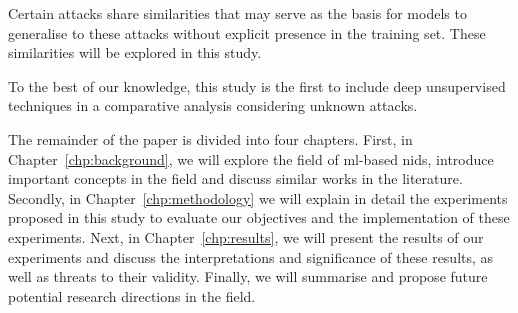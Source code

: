 \begin{center}
\end{center}

Certain attacks share similarities that may serve as the basis for models to
generalise to these attacks without explicit presence in the training set.
These similarities will be explored in this study.

To the best of our knowledge, this study is the first to include deep
unsupervised techniques in a comparative analysis considering unknown attacks.

The remainder of the paper is divided into four chapters. First, in
Chapter~\ref{chp:background}, we will explore the field of \gls{ml}-based
\gls{nids}, introduce important concepts in the field and discuss similar works
in the literature. Secondly, in Chapter~\ref{chp:methodology} we will explain in
detail the experiments proposed in this study to evaluate our objectives and
the implementation of these experiments. Next, in Chapter~\ref{chp:results}, we
will present the results of our experiments and discuss the interpretations and
significance of these results, as well as threats to their validity. Finally,
we will summarise and propose future potential research directions in the
field.